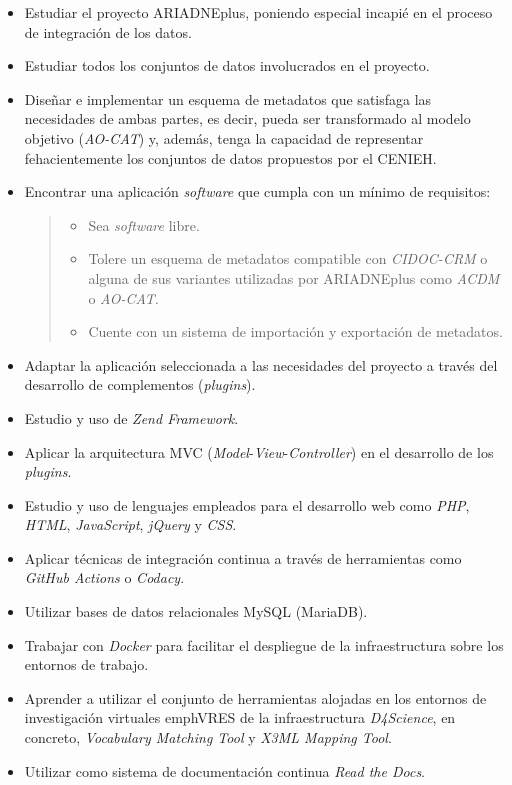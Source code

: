 \begin{itemize}
\tightlist
\item
  Estudiar el proyecto ARIADNEplus, poniendo especial incapié en el
  proceso de integración de los datos.
\item
  Estudiar todos los conjuntos de datos involucrados en el proyecto.
\item
  Diseñar e implementar un esquema de metadatos que satisfaga las
  necesidades de ambas partes, es decir, pueda ser transformado al
  modelo objetivo (\emph{AO-CAT}) y, además, tenga la capacidad de
  representar fehacientemente los conjuntos de datos propuestos por el
  CENIEH.
\item
  Encontrar una aplicación \emph{software} que cumpla con un mínimo de
  requisitos:

  \begin{quote}
  \begin{itemize}
  \tightlist
  \item
    Sea \emph{software} libre.
  \item
    Tolere un esquema de metadatos compatible con \emph{CIDOC-CRM} o
    alguna de sus variantes utilizadas por ARIADNEplus como \emph{ACDM}
    o \emph{AO-CAT}.
  \item
    Cuente con un sistema de importación y exportación de metadatos.
  \end{itemize}
  \end{quote}
\item
  Adaptar la aplicación seleccionada a las necesidades del proyecto a
  través del desarrollo de complementos (\emph{plugins}).
\item
  Estudio y uso de \emph{Zend Framework}.
\item
  Aplicar la arquitectura MVC
  (\emph{Model}-\emph{View}-\emph{Controller}) en el desarrollo de los
  \emph{plugins}.
\item
  Estudio y uso de lenguajes empleados para el desarrollo web como
  \emph{PHP}, \emph{HTML}, \emph{JavaScript}, \emph{jQuery} y
  \emph{CSS}.
\item
  Aplicar técnicas de integración continua a través de herramientas como
  \emph{GitHub Actions} o \emph{Codacy}.
\item
  Utilizar bases de datos relacionales MySQL (MariaDB).
\item
  Trabajar con \emph{Docker} para facilitar el despliegue de la
  infraestructura sobre los entornos de trabajo.
\item
  Aprender a utilizar el conjunto de herramientas alojadas en los entornos de investigación
  virtuales emph{VRES} de la infraestructura \emph{D4Science}, en concreto, \emph{Vocabulary
  Matching Tool} y \emph{X3ML Mapping Tool}.
\item
  Utilizar como sistema de documentación continua \emph{Read the Docs}.
\end{itemize}

